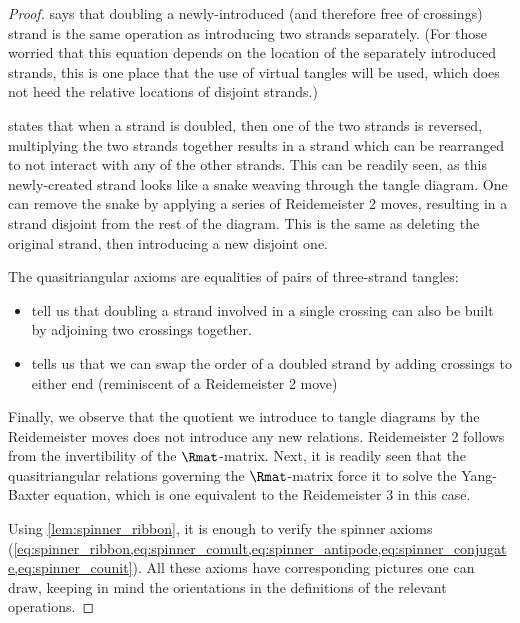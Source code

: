 \begin{proof}
         says that doubling a newly-introduced (and
        therefore free of crossings) strand is the same operation as introducing
        two strands separately. (For those worried that this equation depends on
        the location of the separately introduced strands, this is one place
        that the use of virtual tangles will be used, which does not heed the
        relative locations of disjoint strands.)

         states that when a strand is doubled, then one of
        the two strands is reversed, multiplying the two strands together
        results in a strand which can be rearranged to not interact with any of
        the other strands. This can be readily seen, as this newly-created
        strand looks like a snake weaving through the tangle diagram. One can
        remove the snake by applying a series of Reidemeister 2 moves, resulting
        in a strand disjoint from the rest of the diagram. This is the same as
        deleting the original strand, then introducing a new disjoint one.

        The quasitriangular axioms are equalities of pairs of three-strand
        tangles:
        \begin{itemize}
                \item {} tell us that
                        doubling a strand involved in a single crossing can also
                        be built by adjoining two crossings together.
                \item {} tells us that we can swap the order
                        of a doubled strand by adding crossings to either end
                        (reminiscent of a Reidemeister 2 move)
        \end{itemize}

        Finally, we observe that the quotient we introduce to tangle diagrams by
        the Reidemeister moves does not introduce any new relations.
        Reidemeister 2 follows from the invertibility of the $\Rmat$-matrix.
        Next, it is readily seen that the quasitriangular relations governing
        the $\Rmat$-matrix force it to solve the Yang-Baxter equation, which is
        one equivalent to the Reidemeister 3 in this case.

        Using \cref{lem:spinner_ribbon}, it is enough to verify the spinner
        axioms
        (\cref{eq:spinner_ribbon,eq:spinner_comult,eq:spinner_antipode,eq:spinner_conjugate,eq:spinner_counit}).
        All these axioms have corresponding pictures one can draw, keeping in
        mind the orientations in the definitions of the relevant operations.
\end{proof}

